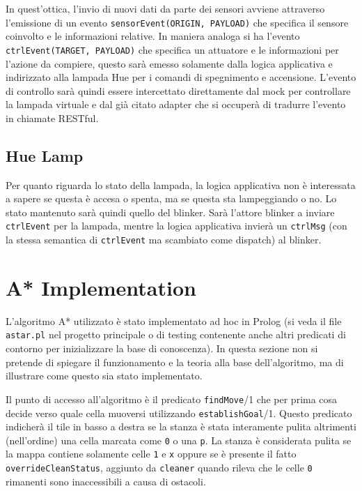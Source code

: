 In quest'ottica, l'invio di nuovi dati da parte dei sensori avviene attraverso l'emissione di un evento \texttt{sensorEvent(ORIGIN, PAYLOAD)} che specifica il sensore coinvolto e le informazioni relative. In maniera analoga si ha l'evento \texttt{ctrlEvent(TARGET, PAYLOAD)} che specifica un attuatore e le informazioni per l'azione da compiere, questo sarà emesso solamente dalla logica applicativa e indirizzato alla lampada Hue per i comandi di spegnimento e accensione. L'evento di controllo sarà quindi essere intercettato direttamente dal mock per controllare la lampada virtuale e dal già citato adapter che si occuperà di tradurre l'evento in chiamate RESTful.

\subsection{Hue Lamp}
Per quanto riguarda lo stato della lampada, la logica applicativa non è interessata a sapere se questa è accesa o spenta, ma se questa sta lampeggiando o no. Lo stato mantenuto sarà quindi quello del blinker. Sarà l'attore blinker a inviare \texttt{ctrlEvent} per la lampada, mentre la logica applicativa invierà un \texttt{ctrlMsg} (con la stessa semantica di \texttt{ctrlEvent} ma scambiato come dispatch) al blinker.

\section{A* Implementation}\label{prt:astar_prolog}
L'algoritmo A* utilizzato è stato implementato ad hoc in Prolog (si veda il file \texttt{astar.pl} nel progetto principale o di testing contenente anche altri predicati di contorno per inizializzare la base di conoscenza). In questa sezione non si pretende di spiegare il funzionamento e la teoria alla base dell'algoritmo, ma di illustrare come questo sia stato implementato.

Il punto di accesso all'algoritmo è il predicato \texttt{findMove}/1 che per prima cosa decide verso quale cella muoversi utilizzando \texttt{establishGoal}/1. Questo predicato indicherà il tile in basso a destra se la stanza è stata interamente pulita altrimenti (nell'ordine) una cella marcata come \texttt{0} o una \texttt{p}.
La stanza è considerata pulita se la mappa contiene solamente celle \texttt{1} e \texttt{x} oppure se è presente il fatto \texttt{overrideCleanStatus}, aggiunto da \texttt{cleaner} quando rileva che le celle \texttt{0} rimanenti sono inaccessibili a causa di ostacoli.

